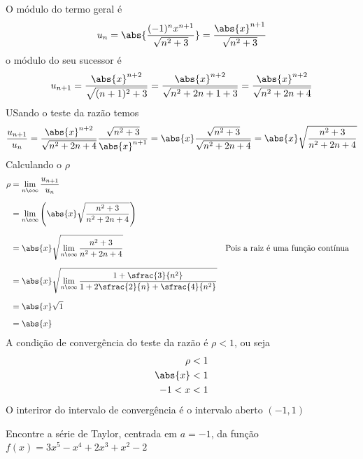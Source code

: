 \documentclass[a4paper,12pt,fleqn]{article}
\begin{document}
\begin{answer}
  O módulo do termo geral é
  \[
    u_n
    = \abs{\frac{(-1)^n x^{n+1}}{\sqrt{n^2 + 3}}}
    = \frac{\abs{x}^{n+1}}{\sqrt{n^2 + 3}}
  \]
  o módulo do seu sucessor é
  \[
    u_{n+1}
    = \frac{\abs{x}^{n+2}}{\sqrt{(n+1)^2 + 3}}
    = \frac{\abs{x}^{n+2}}{\sqrt{n^2+2n+ 1 + 3}}
    = \frac{\abs{x}^{n+2}}{\sqrt{n^2+2n+ 4}}
  \]
  USando o teste da razão temos
  \[
    \frac{u_{n+1}}{u_n}
    = \frac{\abs{x}^{n+2}}{\sqrt{n^2+2n+ 4}} \frac{\sqrt{n^2 + 3}}{\abs{x}^{n+1}}
    = \abs{x} \frac{\sqrt{n^2 + 3}}{\sqrt{n^2+2n+ 4}}
    = \abs{x} \sqrt{\frac{n^2 + 3}{n^2+2n+ 4}}
  \]
  Calculando o $\rho$
  \begin{align*}
    \rho
    & = \lim_{n\o\infty} \frac{u_{n+1}}{u_n} \\[2mm]
    & = \lim_{n\o\infty} \left(\abs{x} \sqrt{\frac{n^2 + 3}{n^2+2n+ 4}}\right) \\[2mm]
    & =  \abs{x} \sqrt{\lim_{n\o\infty}{\frac{n^2 + 3}{n^2+2n+ 4}}}
    & & \text{Pois a raiz é uma função contínua} \\[2mm]
    & =  \abs{x} \sqrt{\lim_{n\o\infty}
                          \frac{ 1 +  \sfrac{3}{n^2}}
                           { 1 + 2\sfrac{2}{n} + \sfrac{4}{n^2}}
                      } \\[2mm]
    & =  \abs{x} \sqrt{1}\\[2mm]
    & =  \abs{x}
  \end{align*}
  A condição de convergência do teste da razão é \(\rho<1\), ou seja
  \begin{align*}
    \rho    & < 1 \\
    \abs{x} & < 1 \\
    -1 < x  & < 1
  \end{align*}
  O interiror do intervalo de convergência é o intervalo aberto \((-1, 1)\)
  \clearpage
\end{answer}

Encontre a série de Taylor, centrada em \(a=-1\), da função
\(
  f(x) = 3x^5 - x^4 + 2x^3 + x^2 - 2
\)
\end{document}
